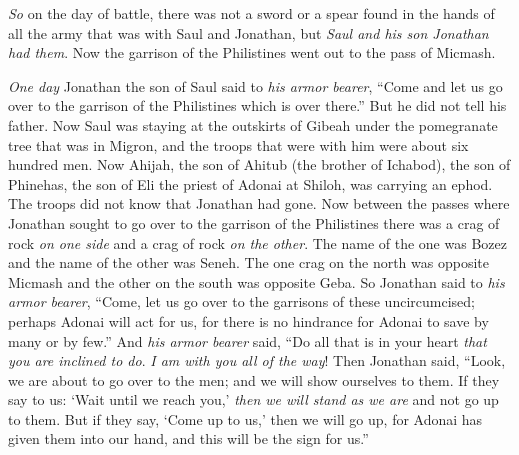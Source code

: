 \begin{biblechapter}
\verse \textit{So} on the day of battle, there was not a sword or a spear found in the hands of all the army that was with Saul and Jonathan, but \textit{Saul and his son Jonathan had them}.
\verse Now the garrison of the Philistines went out to the pass of Micmash.
\end{biblechapter}

\begin{biblechapter} %
 \textit{One day} Jonathan the son of Saul said to \textit{his armor bearer}, “Come and let us go over to the garrison of the Philistines which is over there.” But he did not tell his father.
\verse Now Saul was staying at the outskirts of Gibeah under the pomegranate tree that was in Migron, and the troops that were with him were about six hundred men.
\verse Now Ahijah, the son of Ahitub (the brother of Ichabod), the son of Phinehas, the son of Eli the priest of Adonai at Shiloh, was carrying an ephod. The troops did not know that Jonathan had gone.
\verse Now between the passes where Jonathan sought to go over to the garrison of the Philistines there was a crag of rock \textit{on one side} and a crag of rock \textit{on the other}. The name of the one was Bozez and the name of the other was Seneh.
\verse The one crag on the north was opposite Micmash and the other on the south was opposite Geba.
\verse So Jonathan said to \textit{his armor bearer}, “Come, let us go over to the garrisons of these uncircumcised; perhaps Adonai will act for us, for there is no hindrance for Adonai to save by many or by few.”
\verse And \textit{his armor bearer} said, “Do all that is in your heart \textit{that you are inclined to do}. \textit{I am with you all of the way}!
\verse Then Jonathan said, “Look, we are about to go over to the men; and we will show ourselves to them.
\verse If they say to us: ‘Wait until we reach you,’ \textit{then we will stand as we are} and not go up to them.
\verse But if they say, ‘Come up to us,’ then we will go up, for Adonai has given them into our hand, and this will be the sign for us.”

\end{biblechapter}

